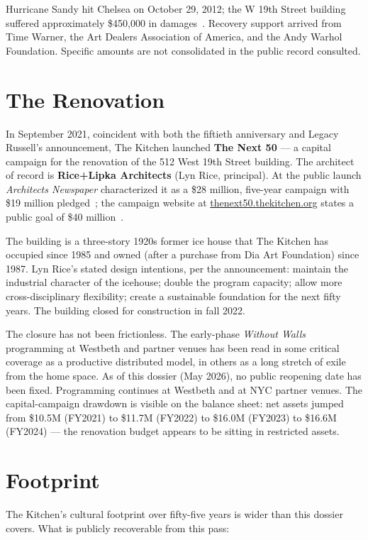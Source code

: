 \documentclass[10pt,letterpaper,twocolumn]{article}
\begin{document}
Hurricane Sandy hit Chelsea on October 29, 2012; the W 19th Street building suffered approximately \$450{,}000 in damages~\citep{wikipedia_kitchen}. Recovery support arrived from Time Warner, the Art Dealers Association of America, and the Andy Warhol Foundation. Specific amounts are not consolidated in the public record consulted.

\section{The Renovation}\label{sec:reno}

In September 2021, coincident with both the fiftieth anniversary and Legacy Russell's announcement, The Kitchen launched \textbf{The Next 50} --- a capital campaign for the renovation of the 512 West 19th Street building. The architect of record is \textbf{Rice+Lipka Architects} (Lyn Rice, principal). At the public launch \emph{Architects Newspaper} characterized it as a \$28 million, five-year campaign with \$19 million pledged~\citep{archpaper2021}; the campaign website at \url{thenext50.thekitchen.org} states a public goal of \$40 million~\citep{thenext50}.

The building is a three-story 1920s former ice house that The Kitchen has occupied since 1985 and owned (after a purchase from Dia Art Foundation) since 1987. Lyn Rice's stated design intentions, per the announcement: maintain the industrial character of the icehouse; double the program capacity; allow more cross-disciplinary flexibility; create a sustainable foundation for the next fifty years. The building closed for construction in fall 2022.

The closure has not been frictionless. The early-phase \emph{Without Walls} programming at Westbeth and partner venues has been read in some critical coverage as a productive distributed model, in others as a long stretch of exile from the home space. As of this dossier (May 2026), no public reopening date has been fixed. Programming continues at Westbeth and at NYC partner venues. The capital-campaign drawdown is visible on the balance sheet: net assets jumped from \$10.5M (FY2021) to \$11.7M (FY2022) to \$16.0M (FY2023) to \$16.6M (FY2024) --- the renovation budget appears to be sitting in restricted assets.

\section{Footprint}

The Kitchen's cultural footprint over fifty-five years is wider than this dossier covers. What is publicly recoverable from this pass:
\end{document}
